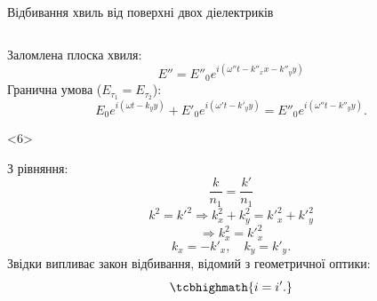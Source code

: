 \documentclass[onlytextwidth]{beamer}
\begin{document}
\begin{frame}[t]{Відбивання хвиль від поверхні двох діелектриків}
\begin{columns}
\begin{column}{0.5\linewidth}
{\begin{block}{}
					Заломлена плоска хвиля:
					\begin{equation*}
						E'' = E''_0 e^{i(\omega'' t - k''_xx-k''_yy)}
					\end{equation*}
					Гранична умова ($E_{\tau_1} = E_{\tau_2}$):
					\begin{equation*}
						E_0 e^{i(\omega t -k_yy)} + E'_0 e^{i(\omega' t - k'_yy)} =E''_0 e^{i(\omega'' t - k''_yy)}.
					\end{equation*}
				\end{block}
			}
			\begin{onlyenv}<6>
				\begin{block}{}\justifying
					З рівняння:
					\begin{equation*}
						\frac{k}{n_1} = \frac{k'}{n_1}
					\end{equation*}
					\begin{equation*}
						k^2 = {k'}^2 \Rightarrow {k_x^2 + k_y^2 = {k'}_x^2 + {k'}_y^2}
					\end{equation*}
					\[
						\Rightarrow k_x^2 = {k'}_x^2
					\]
					\[
						k_x = - {k'}_x,  \quad k_y = k'_y.
					\]
					Звідки випливає закон відбивання, відомий з геометричної оптики:
					\[
						\tcbhighmath{i = i'.}
					\]
				\end{block}
			\end{onlyenv}
\end{column}
\end{columns}
\end{frame}
\end{document}
